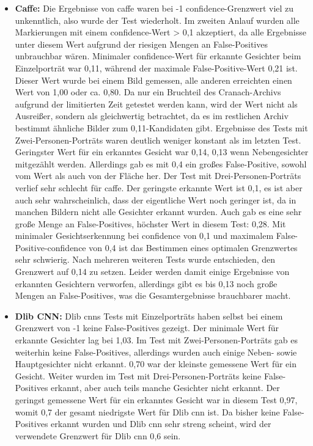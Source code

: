 \begin{itemize}
	\item \textbf{Caffe:} Die Ergebnisse von \gls{caffe} waren bei -1 \gls{confidence}-Grenzwert viel zu unkenntlich, also wurde der Test wiederholt. Im zweiten Anlauf wurden alle Markierungen mit einem \gls{confidence}-Wert > 0{,}1 akzeptiert, da alle Ergebnisse unter diesem Wert aufgrund der riesigen Mengen an False-Positives unbrauchbar wären.  
Minimaler \gls{confidence}-Wert für erkannte Gesichter beim Einzelporträt war 0{,}11, während der maximale False-Positive-Wert 0{,}21 ist. Dieser Wert wurde bei einem Bild gemessen, alle anderen erreichten einen Wert von 1{,}00 oder ca. 0{,}80. Da nur ein Bruchteil des Cranach-Archivs aufgrund der limitierten Zeit getestet werden kann, wird der Wert nicht als Ausreißer, sondern als gleichwertig betrachtet, da es im restlichen Archiv bestimmt ähnliche Bilder zum 0{,}11-Kandidaten gibt.  
Ergebnisse des Tests mit Zwei-Personen-Porträts waren deutlich weniger konstant als im letzten Test. Geringster Wert für ein erkanntes Gesicht war 0{,}14, 0{,}13 wenn Nebengesichter mitgezählt werden. Allerdings gab es mit 0{,}4 ein großes False-Positive, sowohl vom Wert als auch von der Fläche her.  
Der Test mit Drei-Personen-Porträts verlief sehr schlecht für \gls{caffe}. Der geringste erkannte Wert ist 0{,}1, es ist aber auch sehr wahrscheinlich, dass der eigentliche Wert noch geringer ist, da in manchen Bildern nicht alle Gesichter erkannt wurden. Auch gab es eine sehr große Menge an False-Positives, höchster Wert in diesem Test: 0{,}28.  
Mit minimaler Gesichtserkennung bei \gls{confidence} von 0{,}1 und maximalem False-Positive-\gls{confidence} von 0{,}4 ist das Bestimmen eines optimalen Grenzwertes sehr schwierig. Nach mehreren weiteren Tests wurde entschieden, den Grenzwert auf 0{,}14 zu setzen. Leider werden damit einige Ergebnisse von erkannten Gesichtern verworfen, allerdings gibt es bis 0{,}13 noch große Mengen an False-Positives, was die Gesamtergebnisse brauchbarer macht.
%	
	\item \textbf{Dlib CNN:} Dlib \gls{cnn}s Tests mit Einzelporträts haben selbst bei einem Grenzwert von -1 keine False-Positives gezeigt. Der minimale Wert für erkannte Gesichter lag bei 1{,}03.  
Im Test mit Zwei-Personen-Porträts gab es weiterhin keine False-Positives, allerdings wurden auch einige Neben- sowie Hauptgesichter nicht erkannt. 0{,}70 war der kleinste gemessene Wert für ein Gesicht.  
Weiter wurden im Test mit Drei-Personen-Porträts keine False-Positives erkannt, aber auch teils manche Gesichter nicht erkannt. Der geringst gemessene Wert für ein erkanntes Gesicht war in diesem Test 0{,}97, womit 0{,}7 der gesamt niedrigste Wert für Dlib \gls{cnn} ist. Da bisher keine False-Positives erkannt wurden und Dlib \gls{cnn} sehr streng scheint, wird der verwendete Grenzwert für Dlib \gls{cnn} 0{,}6 sein.

\end{itemize}
